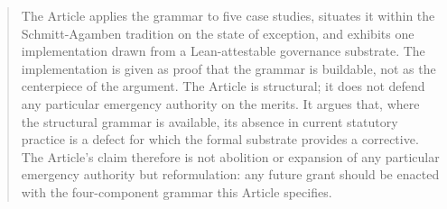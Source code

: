 \documentclass[11pt]{article}
\begin{document}
\begin{abstract}
The Article applies the grammar to five case studies, situates it within the Schmitt-Agamben
tradition on the state of exception, and exhibits one implementation drawn from a Lean-attestable
governance substrate.
The implementation is given as proof that the grammar is buildable, not as the centerpiece of the argument.
The Article is structural; it does not defend any particular emergency authority on the merits.
It argues that, where the structural grammar is available,
its absence in current statutory practice is a defect for which the formal substrate provides a corrective.
The Article's claim therefore is not abolition or expansion of any particular emergency authority
but reformulation: any future grant should be enacted with the four-component grammar this Article specifies.
\end{abstract}











% 
\end{document}
